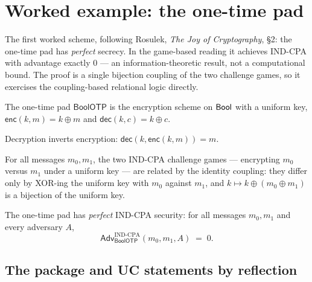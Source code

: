 \chapter{Worked example: the one-time pad}

The first worked scheme, following Rosulek, \emph{The Joy of Cryptography}, §2:
the one-time pad has \emph{perfect} secrecy. In the game-based reading it achieves
IND-CPA with advantage exactly $0$ --- an information-theoretic result, not a
computational bound. The proof is a single bijection coupling of the two
challenge games, so it exercises the coupling-based relational logic directly.

\begin{definition}
  \label{def:otp-scheme}
  \leanok
  The one-time pad $\mathsf{BoolOTP}$ is the encryption scheme on
  $\mathsf{Bool}$ with a uniform key, $\mathsf{enc}(k,m) = k \oplus m$ and
  $\mathsf{dec}(k,c) = k \oplus c$.
\end{definition}

\begin{theorem}[Correctness]
  \label{thm:otp-correct}
  \leanok
  Decryption inverts encryption: $\mathsf{dec}(k, \mathsf{enc}(k, m)) = m$.
\end{theorem}

\begin{lemma}
  \label{lem:otp-coupling}
  \leanok
  For all messages $m_0, m_1$, the two IND-CPA challenge games --- encrypting
  $m_0$ versus $m_1$ under a uniform key --- are related by the identity coupling:
  they differ only by XOR-ing the uniform key with $m_0$ against $m_1$, and
  $k \mapsto k \oplus (m_0 \oplus m_1)$ is a bijection of the uniform key.
\end{lemma}

\begin{theorem}
  \label{thm:otp-perfect}
  \leanok
  The one-time pad has \emph{perfect} IND-CPA security: for all messages
  $m_0, m_1$ and every adversary $A$,
  \[
    \mathsf{Adv}^{\mathrm{IND\text{-}CPA}}_{\mathsf{BoolOTP}}(m_0, m_1, A) \;=\; 0.
  \]
\end{theorem}

\section{The package and UC statements by reflection}

